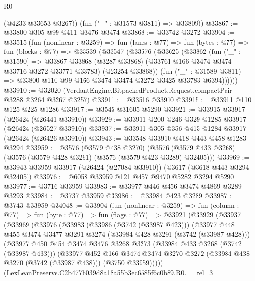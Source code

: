 \begin{lexlean}{R0}
\begin{coremodule}
        (@4233 @33653 @3267))
      (fun ("_" : @31573 @3811) => @33809))
@33867 := @33800 @305 @99 @411 @3476 @3474
@33868 := @33742 @3272
@33904 := @33515
    (fun (nonlinear : @3259) =>
    fun (lanes : @77) =>
    fun (bytes : @77) =>
    fun (blocks : @77) =>
    @33539
      (@33547
        (@33576
          (@33625
            (@33862
              (fun ("_" : @31590) =>
              @33867
                @33868
                (@3287 @33868)
                (@33761 @166 @3474 @3474 @33716 @3272 @33771 @33783)
                (@23254 @33868))
              (fun ("_" : @31589 @3811) =>
              @33800 @110 @99 @166 @3474 @3474 @3272 @3425 @33783 @6394))))))
@33910 := @32020 (VerdantEngine.BitpackedProduct.Request.compactPair @3288 @3264 @3267 @3257)
@33911 := @33516 @33910
@33915 := @33911 @110 @125 @225 @1286
@33917 := @3545 @31605 @5290
@33921 := @33915 @33917 (@26424 (@26441 @33910))
@33929 := @33911 @200 @246 @329 @1285 @33917 (@26424 (@26527 @33910))
@33937 := @33911 @305 @356 @415 @1284 @33917 (@26424 (@26426 @33910))
@33943 := @33548 @33910 @418 @443 @458 @1283 @3294
@33959 := @3576
    (@3579 @438 @3270)
    (@3576 (@3579 @433 @3268) (@3576 (@3579 @428 @3291) (@3576 (@3579 @423 @3289) @32405)))
@33969 := @33943 @33959 @33917 (@26424 (@27084 @33910)) (@3617 (@3618 @443 @3294 @32405))
@33976 := @6058 @33959 @121 @457 @9470 @5282 @3294 @5290
@33977 := @3716 @33959
@33983 := @33977 @446 @456 @3474 @4869 @3289 @3293
@33984 := @3737 @33959
@33986 := @33984 @423 @3289
@33987 := @3743 @33959
@34048 := @33904
    (fun (nonlinear : @3259) =>
    fun (column : @77) =>
    fun (byte : @77) =>
    fun (flags : @77) =>
    @33921
      (@33929
        (@33937
          (@33969
            (@33976
              (@33983
                (@33986 (@3742 (@33987 @423)))
                (@33977
                  @448
                  @455
                  @3474
                  @3477
                  @3291
                  @3274
                  (@33984 @428 @3291 (@3742 (@33987 @428)))
                  (@33977
                    @450
                    @454
                    @3474
                    @3476
                    @3268
                    @3273
                    (@33984 @433 @3268 (@3742 (@33987 @433)))
                    (@33977
                      @452
                      @166
                      @3474
                      @3474
                      @3270
                      @3272
                      (@33984 @438 @3270 (@3742 (@33987 @438)))
                      (@3750 @33959)))))
              (LexLeanPreserve.C2b477b039d8a18a55b3ec6585f6c0b89.R0.__rel_3

\end{coremodule}
\end{lexlean}
